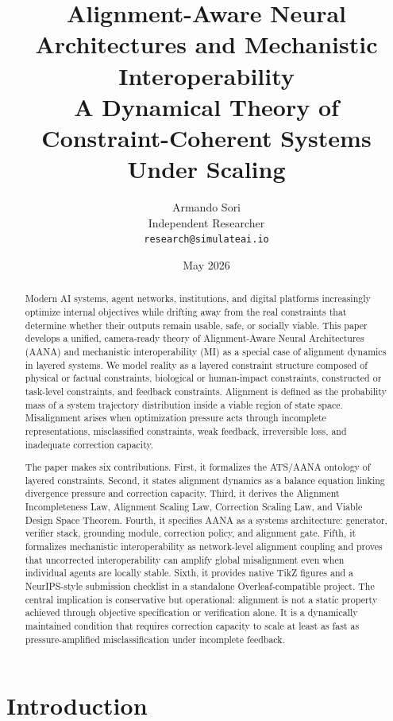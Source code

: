 \documentclass[11pt]{article}
\title{\vspace{-1.5em}\textbf{Alignment-Aware Neural Architectures and Mechanistic Interoperability}\\
\large A Dynamical Theory of Constraint-Coherent Systems Under Scaling}
\author{Armando Sori\\
Independent Researcher\\
\texttt{research@simulateai.io}}
\date{May 2026}
\begin{document}
\maketitle
\thispagestyle{empty}

\begin{abstract}
Modern AI systems, agent networks, institutions, and digital platforms increasingly optimize internal objectives while drifting away from the real constraints that determine whether their outputs remain usable, safe, or socially viable. This paper develops a unified, camera-ready theory of Alignment-Aware Neural Architectures (AANA) and mechanistic interoperability (MI) as a special case of alignment dynamics in layered systems. We model reality as a layered constraint structure composed of physical or factual constraints, biological or human-impact constraints, constructed or task-level constraints, and feedback constraints. Alignment is defined as the probability mass of a system trajectory distribution inside a viable region of state space. Misalignment arises when optimization pressure acts through incomplete representations, misclassified constraints, weak feedback, irreversible loss, and inadequate correction capacity. 

The paper makes six contributions. First, it formalizes the ATS/AANA ontology of layered constraints. Second, it states alignment dynamics as a balance equation linking divergence pressure and correction capacity. Third, it derives the Alignment Incompleteness Law, Alignment Scaling Law, Correction Scaling Law, and Viable Design Space Theorem. Fourth, it specifies AANA as a systems architecture: generator, verifier stack, grounding module, correction policy, and alignment gate. Fifth, it formalizes mechanistic interoperability as network-level alignment coupling and proves that uncorrected interoperability can amplify global misalignment even when individual agents are locally stable. Sixth, it provides native TikZ figures and a NeurIPS-style submission checklist in a standalone Overleaf-compatible project. The central implication is conservative but operational: alignment is not a static property achieved through objective specification or verification alone. It is a dynamically maintained condition that requires correction capacity to scale at least as fast as pressure-amplified misclassification under incomplete feedback.
\end{abstract}

\section{Introduction}
\end{document}
